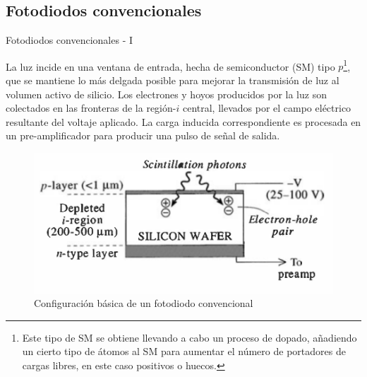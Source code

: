 \documentclass[a4paper,10pt]{beamer}
\begin{document}
\subsection{Fotodiodos convencionales}

\begin{frame}{Fotodiodos convencionales - I}

\begin{justify}
La luz incide en una ventana de entrada, hecha de semiconductor (SM) tipo $p$\footnote{Este 
tipo de SM se obtiene llevando a cabo un proceso de dopado, añadiendo un 
cierto tipo de átomos al SM para aumentar el número de portadores de cargas libres, 
en este caso positivos o huecos.}, que se mantiene lo más delgada posible para mejorar 
la transmisión de luz al volumen activo de silicio. Los electrones y hoyos producidos 
por la luz son colectados en las fronteras de la región-$i$ central, llevados por 
el campo eléctrico resultante del voltaje aplicado. La carga inducida correspondiente 
es procesada en un pre-amplificador para producir una pulso de señal de salida.
\end{justify}

\begin{figure}
 \center 
 \includegraphics[scale=0.42]{fig40}
 \caption{Configuración básica de un fotodiodo convencional}
\end{figure}

\end{frame}
\end{document}
